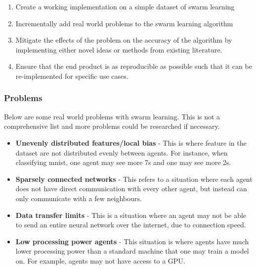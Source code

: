 \begin{enumerate}
	\item Create a working implementation on a simple dataset of swarm learning
	\item Incrementally add real world problems to the swarm learning algorithm
	\item Mitigate the effects of the problem on the accuracy of the algorithm by implementing either novel ideas or methods from existing literature.
	\item Ensure that the end product is as reproducible as possible such that it can be re-implemented for specific use cases.
\end{enumerate}
\subsubsection{Problems}
Below are some real world problems with swarm learning. This is not a comprehensive list and more problems could be researched if necessary.
\begin{itemize}
	\item \textbf{Unevenly distributed features/local bias} - This is where feature in the dataset are not distributed evenly between agents. For instance, when classifying mnist, one agent may see more 7s and one may see more 2s.
	\item \textbf{Sparsely connected networks} - This refers to a situation where each agent does not have direct communication with every other agent, but instead can only communicate with a few neighbours.
	\item \textbf{Data transfer limits} - This is a situation where an agent may not be able to send an entire neural network over the internet, due to connection speed.
	\item \textbf{Low processing power agents} - This situation is where agents have much lower processing power than a standard machine that one may train a model on. For example, agents may not have access to a GPU.
\end{itemize}	

